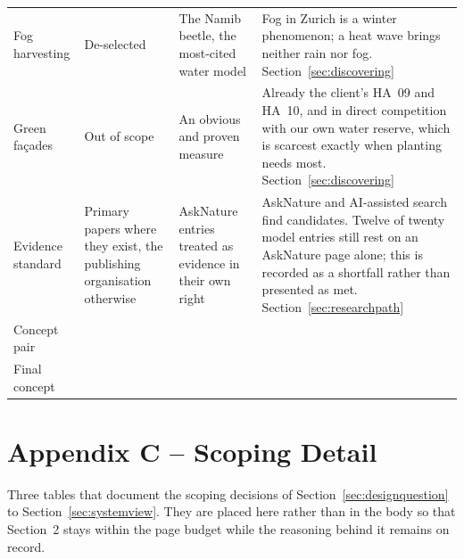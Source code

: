 \begin{longtable}{L{2.6cm} L{3.0cm} L{3.0cm} L{5.7cm}}
Fog harvesting & De-selected & The Namib beetle, the most-cited water model & Fog in Zurich is a winter phenomenon; a heat wave brings neither rain nor fog. Section~\ref{sec:discovering} \\

Green façades & Out of scope & An obvious and proven measure & Already the client's HA~09 and HA~10, and in direct competition with our own water reserve, which is scarcest exactly when planting needs most. Section~\ref{sec:discovering} \\

Evidence standard & Primary papers where they exist, the publishing organisation otherwise & AskNature entries treated as evidence in their own right & AskNature and AI-assisted search find candidates. Twelve of twenty model entries still rest on an AskNature page alone; this is recorded as a shortfall rather than presented as met. Section~\ref{sec:researchpath} \\

Concept pair &  &  &  \\

Final concept &  & \todo{} &  \\

\end{longtable}

\clearpage
\section*{Appendix C -- Scoping Detail}
\setcounter{table}{0}
\renewcommand{\thetable}{C.\arabic{table}}

\noindent Three tables that document the scoping decisions of
Section~\ref{sec:designquestion} to Section~\ref{sec:systemview}. They are
placed here rather than in the body so that Section~2 stays within the page
budget while the reasoning behind it remains on record.

